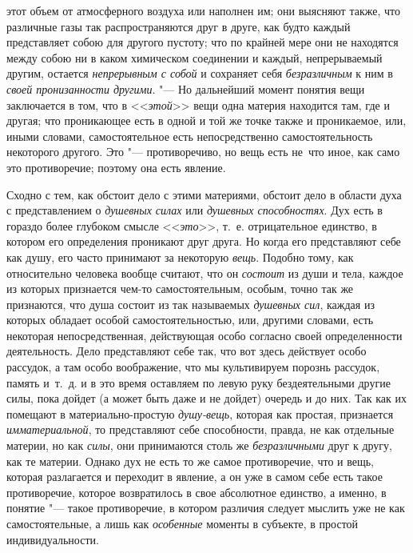 этот объем от атмосферного воздуха или наполнен им; они выясняют также, что
различные газы так распространяются друг в друге, как будто каждый
представляет собою для другого пустоту; что по крайней мере они не
находятся между собою ни в каком химическом соединении и каждый,
непрерываемый другим, остается {\em непрерывным с
собой} и сохраняет себя {\em безразличным} к ним в
{\em своей пронизанности другими}. "--- Но дальнейший
момент понятия вещи заключается в том, что в
<<{\em этой}>> вещи одна материя находится там, где и
другая; что проникающее есть в одной и той же точке также и проникаемое,
или, иными словами, самостоятельное есть непосредственно самостоятельность
некоторого другого. Это "--- противоречиво, но вещь есть не~что иное, как само
это противоречие; поэтому она есть явление.

Сходно с тем, как обстоит дело с этими материями, обстоит дело в области
духа с представлением о {\em душевных силах} или
{\em душевных способностях}. Дух есть в гораздо более
глубоком смысле <<{\em это}>>, т.~е. отрицательное
единство, в котором его определения проникают друг друга. Но когда его
представляют себе как душу, его часто принимают за некоторую
{\em вещь}. Подобно тому, как относительно человека
вообще считают, что он {\em состоит} из души и тела,
каждое из которых признается чем-то самостоятельным, особым, точно так же
признаются, что душа состоит из так называемых
{\em душевных сил}, каждая из которых обладает особой
самостоятельностью, или, другими словами, есть некоторая непосредственная,
действующая особо согласно своей определенности деятельность. Дело
представляют себе так, что вот здесь действует особо рассудок, а там особо
воображение, что мы культивируем порознь рассудок, память и~т.~д. и в это
время оставляем по левую руку бездеятельными другие силы, пока дойдет (а
может быть даже и не дойдет) очередь и до них. Так как их помещают в
материально-простую {\em душу-вещь}, которая как
простая, признается {\em имматериальной}, то
представляют себе способности, правда, не как отдельные материи, но как
{\em силы}, они принимаются столь же
{\em безразличными} друг к другу, как те материи.
Однако дух не есть то же самое противоречие, что и вещь, которая
разлагается и переходит в явление, а он уже в самом себе есть такое
противоречие, которое возвратилось в свое абсолютное единство, а именно, в
понятие "--- такое противоречие, в котором различия следует мыслить уже не как
самостоятельные, а лишь как {\em особенные} моменты в
субъекте, в простой индивидуальности.
